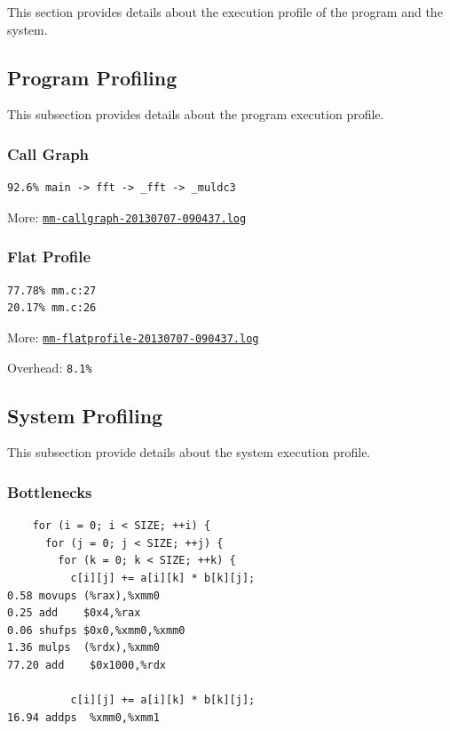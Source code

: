 \documentclass[a4paper]{article}
\begin{document}
This section provides details about the execution profile of the program and the system.

\subsection{Program Profiling}

This subsection provides details about the program execution profile.

\subsubsection{Call Graph}

\begin{verbatim}
92.6% main -> fft -> _fft -> _muldc3
\end{verbatim}

More: \href{TBD}{\tt mm-callgraph-20130707-090437.log}

\subsubsection{Flat Profile}

\begin{verbatim}
77.78% mm.c:27
20.17% mm.c:26
\end{verbatim}

More: \href{TBD}{\tt mm-flatprofile-20130707-090437.log}

Overhead: {\tt 8.1\%}

\subsection{System Profiling}

This subsection provide details about the system execution profile.

\subsubsection{Bottlenecks}

\begin{verbatim}
    for (i = 0; i < SIZE; ++i) {
      for (j = 0; j < SIZE; ++j) {
        for (k = 0; k < SIZE; ++k) {
          c[i][j] += a[i][k] * b[k][j];
0.58 movups (%rax),%xmm0
0.25 add    $0x4,%rax
0.06 shufps $0x0,%xmm0,%xmm0
1.36 mulps  (%rdx),%xmm0
77.20 add    $0x1000,%rdx

          c[i][j] += a[i][k] * b[k][j];
16.94 addps  %xmm0,%xmm1
\end{verbatim}
\end{document}
